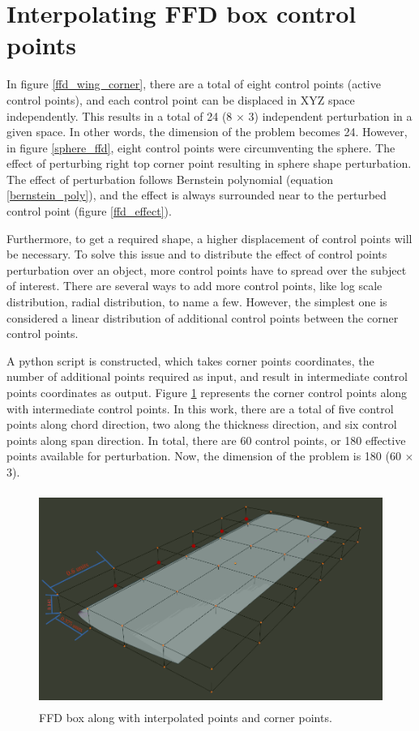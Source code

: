 \section{Interpolating FFD box control points}
In figure \ref{ffd_wing_corner}, there are a total of eight control points (active control points), and each control point can be displaced in XYZ space independently. This results in a total of 24 (8 $\times$ 3) independent perturbation in a given space. In other words, the dimension of the problem becomes 24. However, in figure \ref{sphere_ffd}, eight control points were circumventing the sphere. The effect of perturbing right top corner point resulting in sphere shape perturbation. The effect of perturbation follows Bernstein polynomial (equation \ref{bernstein_poly}), and the effect is always surrounded near to the perturbed control point (figure \ref{ffd_effect}).

Furthermore, to get a required shape, a higher displacement of control points will be necessary. To solve this issue and to distribute the effect of control points perturbation over an object, more control points have to spread over the subject of interest. There are several ways to add more control points, like log scale distribution, radial distribution, to name a few. However, the simplest one is considered a linear distribution of additional control points between the corner control points. 

A python script is constructed, which takes corner points coordinates, the number of additional points required as input, and result in intermediate control points coordinates as output. Figure \ref{ffd_wing_interpolate} represents the corner control points along with intermediate control points. In this work, there are a total of five control points along chord direction, two along the thickness direction, and six control points along span direction. In total, there are 60 control points, or 180 effective points available for perturbation. Now, the dimension of the problem is 180 (60 $\times$ 3).    
\begin{figure}
    \centering
    \includegraphics[height = 70mm, width=\textwidth]{figures/wing_all_cp_FFD.png}
    \caption{FFD box along with interpolated points and corner points.}
    \label{ffd_wing_interpolate}
\end{figure}

